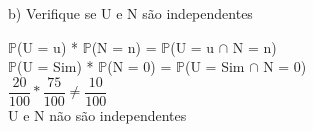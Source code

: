 \documentclass[12pt,a4paper,draft]{article}
\begin{document}
	\vspace{1cm}
	b) Verifique se U e N são independentes
	\vspace{1cm}\\
	\begin{center}
		$\mathbb{P}$(U = u) * $\mathbb{P}$(N = n) = $\mathbb{P}$(U = u $\cap$ N = n)
		\vspace{1cm}\\
		$\mathbb{P}$(U = Sim) * $\mathbb{P}$(N = 0) = $\mathbb{P}$(U = Sim $\cap$ N = 0)
		\vspace{0.25cm}\\
		$\dfrac{20}{100} * \dfrac{75}{100} \neq \dfrac{10}{100}$
		\vspace{1cm}\\	
		U e N não são independentes
	\end{center}
\end{document}
